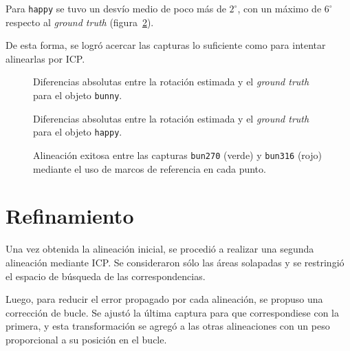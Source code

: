 			Para \texttt{happy} se tuvo un desvío medio de poco más de
			$2^{\circ}$, con un máximo de $6^{\circ}$ respecto al \emph{ground truth} (figura~\ref{fig:clust_happy}).

			De esta forma, se logró acercar las capturas lo suficiente como
			para intentar alinearlas por ICP.

		\begin{figure}
			\caption{\label{fig:clust_bunny}Diferencias absolutas entre la rotación estimada y el \emph{ground truth} para el objeto \texttt{bunny}.}
		\end{figure}

		\begin{figure}
			\caption{\label{fig:clust_happy}Diferencias absolutas entre la rotación estimada y el \emph{ground truth} para el objeto \texttt{happy}.}
		\end{figure}

		\begin{figure}
			\caption{\label{fig:clust_bun_good}Alineación exitosa entre las capturas \texttt{bun270} (verde) y \texttt{bun316} (rojo) mediante el uso de marcos de referencia en cada punto.} 
		\end{figure}


	\section{Refinamiento}
	Una vez obtenida la alineación inicial, se procedió a realizar una segunda
	alineación mediante ICP.
	Se consideraron sólo las áreas solapadas y se restringió el
	espacio de búsqueda de las correspondencias.

	Luego, para reducir el error propagado por cada alineación, se propuso una
	corrección de bucle.
	Se ajustó la última captura para que correspondiese con la primera, y
	esta transformación se agregó a las otras alineaciones con un peso
	proporcional a su posición en el bucle.
	

